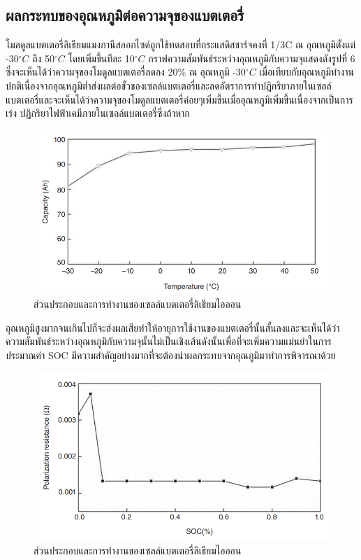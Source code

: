 \subsection{ผลกระทบของอุณหภูมิต่อความจุของแบตเตอรี่}
โมลดูลแบตเตอรี่ลิเธียมแมงกานีสออกไซด์ถูกใช้ทดสอบที่กระแสดิสชาร์จคงที่ 1/3C ณ อุณหภูมิตั้งแต่ -30$^{\circ}C$ ถึง 50$^{\circ}C$ โดยเพิ่มขึ้นทีละ 10$^{\circ}C$  กราฟความสัมพันธ์ระหว่างอุณหภูมิกับความจุแสดงดังรูปที่ 6 ซึ่งจะเห็นได้ว่าความจุของโมดูลแบตเตอรี่ลดลง 20\% ณ อุณหภูมิ -30$^{\circ}C$ เมื่อเทียบกับอุณหภูมิทำงานปกติเนื่องจากอุณหภูมิต่ำส่งผลต่อขั้วของเซลล์แบตเตอรี่และลดอัตราการทำปฏิกริยาภายในเซลล์แบตเตอรี่และจะเห็นได้ว่าความจุของโมดูลแบตเตอรี่ค่อยๆเพิ่มขึ้นเมื่ออุณหภูมิเพิ่มขึ้นเนื่องจากเป็นการเร่ง
ปฏิกริยาไฟฟ้าเคมีภายในเซลล์แบตเตอรี่ซึ่งถ้าหาก\newline
\begin{center}
	\begin{figure}[!h]
		\includegraphics[width=0.6\linewidth]{Chapters/img/Current_vs_Temp.png}
			\centering
			\captionsetup{justification=centering,margin=2cm}
			\caption{ส่วนประกอบและการทำงานของเซลล์แบตเตอรี่ลิเธียมไอออน}
	\end{figure}
\end{center}
อุณหภูมิสูงมากจนเกินไปก็จะส่งผลเสียทำให้อายุการใช้งานของแบตเตอรี่นั้นสั้นลงและจะเห็นได้ว่าความสัมพันธ์ระหว่างอุณหภูมิกับความจุนั้นไม่เป็นเชิงเส้นดังนั้นเพื่อที่จะเพิ่มความแม่นยำในการประมาณค่า SOC มีความสำคัญอย่างมากที่จะต้องนำผลกระทบจากอุณภูมิมาทำการพิจารณาด้วย\newline
\begin{center}
	\begin{figure}[!h]
		\includegraphics[width=0.6\linewidth]{Chapters/img/Pol_Resistance_vs_SOC.png}
			\centering
			\captionsetup{justification=centering,margin=2cm}
			\caption{ส่วนประกอบและการทำงานของเซลล์แบตเตอรี่ลิเธียมไอออน}
	\end{figure}
\end{center}
